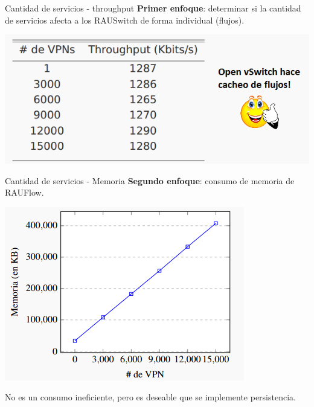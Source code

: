 \documentclass[xcolor=svgnames]{beamer}
\begin{document}
\begin{frame}{Cantidad de servicios - throughput}
	\textbf{Primer enfoque}: determinar si la cantidad de servicios afecta a los RAUSwitch de forma individual (flujos).
	\begin{center}
		\includegraphics[scale=0.6]{throughput2}
	\end{center}
\end{frame}

\begin{frame}{Cantidad de servicios - Memoria}
	\textbf{Segundo enfoque}: consumo de memoria de RAUFlow.
	\pause
	\begin{center}
		\includegraphics[scale=0.8]{memoria_rauflow}
	\end{center}
	\pause
	No es un consumo ineficiente, pero es deseable que se implemente persistencia.
\end{frame}
\end{document}
